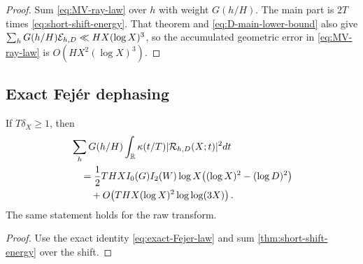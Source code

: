 \begin{proof}
Sum \eqref{eq:MV-ray-law} over $h$ with weight $G(h/H)$.  The main part is
$2T$ times \eqref{eq:short-shift-energy}.  That theorem and
\eqref{eq:D-main-lower-bound} also give
$\sum_hG(h/H)\mathcal E_{h,D}\ll HX(\log X)^3$, so the accumulated geometric
error in \eqref{eq:MV-ray-law} is $O(HX^2(\log X)^3)$.
\end{proof}

\subsection{Exact Fej\'er dephasing}

\begin{corollary}
\label{cor:short-Fejer-band}
If $T\delta_X\geq1$, then
\begin{equation}
 \begin{aligned}
 &\sum_hG(h/H)
 \int_\mathbb R\kappa(t/T)|\mathcal R_{h,D}(X;t)|^2dt\\
 &\quad={}
 \frac12THX I_0(G)I_2(W)\log X
 \bigl((\log X)^2-(\log D)^2\bigr)\\
 &\qquad+O\!\left(
 THX(\log X)^2\log\log(3X)
 \right).
 \end{aligned}
 \label{eq:short-Fejer-band}
\end{equation}
The same statement holds for the raw transform.
\end{corollary}

\begin{proof}
Use the exact identity \eqref{eq:exact-Fejer-law} and sum
\cref{thm:short-shift-energy} over the shift.
\end{proof}
